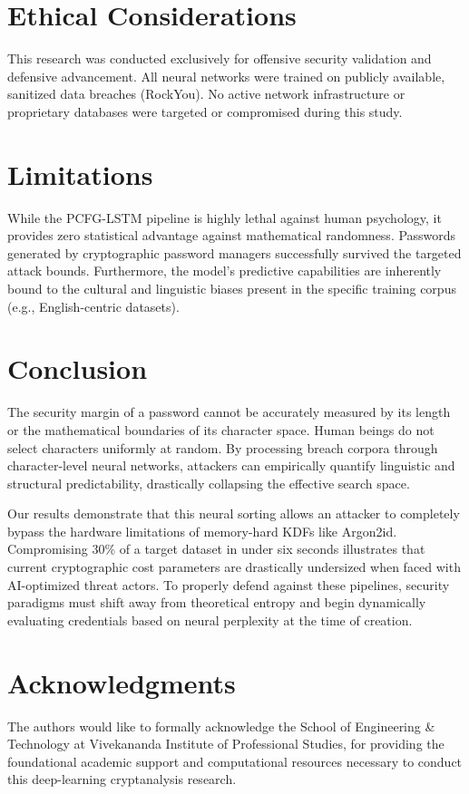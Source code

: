 \documentclass[conference]{IEEEtran}
\begin{document}
\section{Ethical Considerations}
This research was conducted exclusively for offensive security validation and defensive advancement. All neural networks were trained on publicly available, sanitized data breaches (RockYou). No active network infrastructure or proprietary databases were targeted or compromised during this study.

\section{Limitations}
While the PCFG-LSTM pipeline is highly lethal against human psychology, it provides zero statistical advantage against mathematical randomness. Passwords generated by cryptographic password managers successfully survived the targeted attack bounds. Furthermore, the model's predictive capabilities are inherently bound to the cultural and linguistic biases present in the specific training corpus (e.g., English-centric datasets).

\section{Conclusion}
The security margin of a password cannot be accurately measured by its length or the mathematical boundaries of its character space. Human beings do not select characters uniformly at random. By processing breach corpora through character-level neural networks, attackers can empirically quantify linguistic and structural predictability, drastically collapsing the effective search space.

Our results demonstrate that this neural sorting allows an attacker to completely bypass the hardware limitations of memory-hard KDFs like Argon2id. Compromising 30\% of a target dataset in under six seconds illustrates that current cryptographic cost parameters are drastically undersized when faced with AI-optimized threat actors. To properly defend against these pipelines, security paradigms must shift away from theoretical entropy and begin dynamically evaluating credentials based on neural perplexity at the time of creation.

\section*{Acknowledgments}
The authors would like to formally acknowledge the School of Engineering \& Technology at Vivekananda Institute of Professional Studies, for providing the foundational academic support and computational resources necessary to conduct this deep-learning cryptanalysis research.
\end{document}
